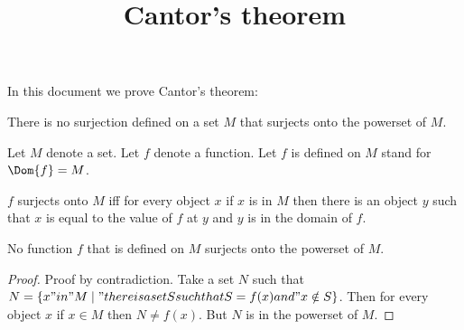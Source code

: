 \documentclass{article}
\title{Cantor's theorem}
\author{}
\date{}
\begin{document}

  \maketitle

  In this document we prove Cantor's theorem:

  \begin{quotedtheorem}
    There is no surjection defined on a set $M$ that surjects onto the powerset of $M$.
  \end{quotedtheorem}

  \begin{forthel}

    Let $M$ denote a set. Let $f$ denote a function.
    Let $f$ is defined on $M$ stand for $\Dom{f} = M$.

    \begin{definition}
      $f$ surjects onto $M$ iff
        for every object $x$ if $x$ is in $M$ then there is an object $y$ such that
          $x$ is equal to the value of $f$ at $y$ and $y$ is in the domain of $f$.
    \end{definition}

    \begin{theorem}[Cantor]
      No function $f$ that is defined on $M$ surjects onto the powerset of $M$.
    \end{theorem}
    \begin{proof}
      Proof by contradiction.
      Take a set $N$ such that $N = \{ x "in" M \mid "there is a set S such that S = f(x) and" x \notin S \}$.
      Then for every object $x$ if $x \in M$ then $N \neq f(x)$.
      But $N$ is in the powerset of $M$.
    \end{proof}
  \end{forthel}
\end{document}
